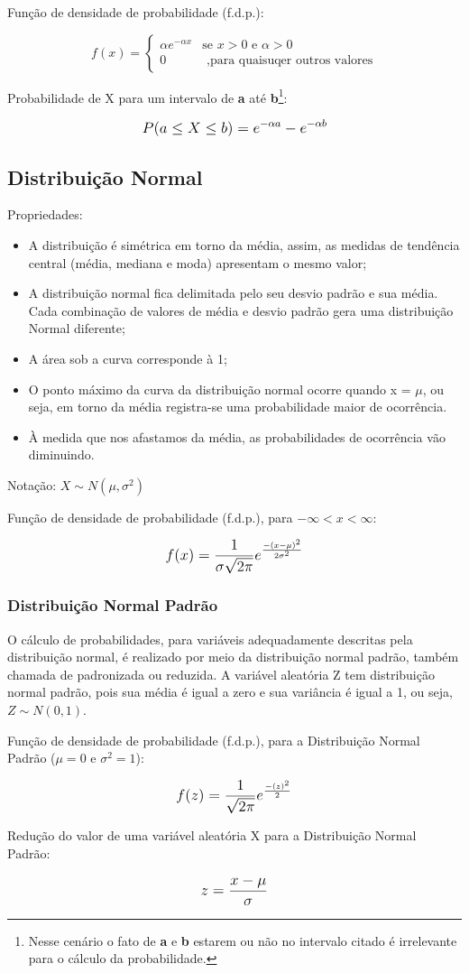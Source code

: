 Função de densidade de probabilidade (f.d.p.):

\[ f(x) =
  \begin{cases}
    \alpha e^{- \alpha x}    & \text{se } x>0 \text{ e } \alpha>0\\
    0 		& \text{ ,para quaisuqer outros valores}
  \end{cases}
\]

Probabilidade de X para um intervalo de \textbf{a} até \textbf{b}\footnote{Nesse cenário o fato de \textbf{a} e \textbf{b} estarem ou não no intervalo citado é irrelevante para o cálculo da probabilidade.}:

\[\beq{ P( a \leq X \leq b ) = e^{- \alpha a} - e^{- \alpha b} }\]


\subsection{Distribuição Normal}

Propriedades:
\begin{itemize}
	\item A distribuição é simétrica em torno da média, assim, as medidas de tendência central (média, mediana e moda) apresentam o mesmo valor;
 	\item A distribuição normal fica delimitada pelo seu desvio padrão e sua média. Cada combinação de valores de média e desvio padrão gera uma distribuição Normal diferente;
	\item A área sob a curva corresponde à 1;
	\item O ponto máximo da curva da distribuição normal ocorre quando x = \(\mu\), ou seja, em torno da média registra-se uma probabilidade maior de ocorrência. 
	\item À medida que nos afastamos da média, as probabilidades de ocorrência vão diminuindo.
\end{itemize}

Notação: \(X \sim N( \mu , \sigma^2 ) \)

Função de densidade de probabilidade (f.d.p.), para \( - \infty < x < \infty \):


\[\beq{ f(x) = \frac{1}{\sigma\sqrt{2\pi}} e^{\frac{-(x-\mu)^2}{2\sigma^2}{}} }\]

\subsubsection{Distribuição Normal Padrão}

O cálculo de probabilidades, para variáveis adequadamente descritas pela distribuição normal, é realizado por meio da distribuição normal padrão, também chamada de padronizada ou reduzida. A variável aleatória Z tem distribuição normal padrão, pois sua média é igual a zero e sua variância é igual a 1, ou seja, \( Z \sim N (0, 1) \).

Função de densidade de probabilidade (f.d.p.), para a Distribuição Normal Padrão (\( \mu = 0 \) e \( \sigma^2 = 1 \)):


\[\beq{ f(z) = \frac{1}{\sqrt{2\pi}} e^{\frac{-(z)^2}{2}{}} }\]

Redução do valor de uma variável aleatória X para a Distribuição Normal Padrão:

\[\beq{ z = \frac{x - \mu}{\sigma} }\]
